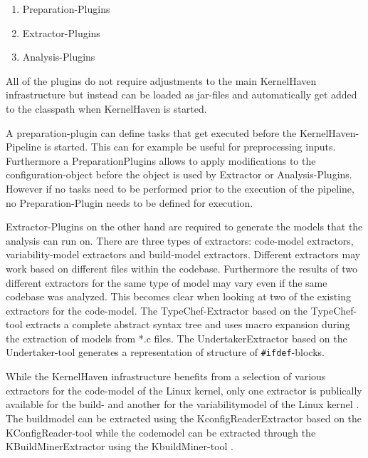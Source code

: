 \documentclass[a4paper]{article}
\begin{document}
\begin{enumerate}
    \item Preparation-Plugins
	\item Extractor-Plugins
	\item Analysis-Plugins
\end{enumerate}

All of the plugins do not require adjustments to the main KernelHaven infrastructure but instead can be loaded as jar-files and automatically get added to the classpath when KernelHaven is started.

A preparation-plugin can define tasks that get executed before the KernelHaven-Pipeline is started. This can for example be useful for preprocessing inputs. Furthermore a PreparationPlugins allows to apply modifications to the configuration-object before the object is used by Extractor or Analysis-Plugins. However if no tasks need to be performed prior to the execution of the pipeline, no Preparation-Plugin needs to be defined for execution. 

Extractor-Plugins on the other hand are required to generate the models that the analysis can run on. There are three types of extractors: code-model extractors, variability-model extractors and build-model extractors. Different extractors may work based on different files within the codebase. Furthermore the results of two different extractors for the same type of model may vary even if the same codebase was analyzed. This becomes clear when looking at two of the existing extractors for the code-model. The TypeChef-Extractor based on the TypeChef-tool \cite{Kenner:2010:TTT:1868688.1868693} extracts a complete abstract syntax tree and uses macro expansion during the extraction of models from *.c files. The UndertakerExtractor based on the Undertaker-tool \cite{Tartler:2011:FCC:1966445.1966451} generates a representation of structure of \texttt{\#ifdef}-blocks.

While the KernelHaven infrastructure benefits from a selection of various extractors for the code-model of the Linux kernel, only one extractor is publically available for the build- and another for the variabilitymodel of the Linux kernel \cite{KernelHave-wh}. The buildmodel can be extracted using the KconfigReaderExtractor based on the KConfigReader-tool \cite{ck-kconfig} while the codemodel can be extracted through the KBuildMinerExtractor using the KbuildMiner-tool \cite{ck-kbuild}.
\end{document}
